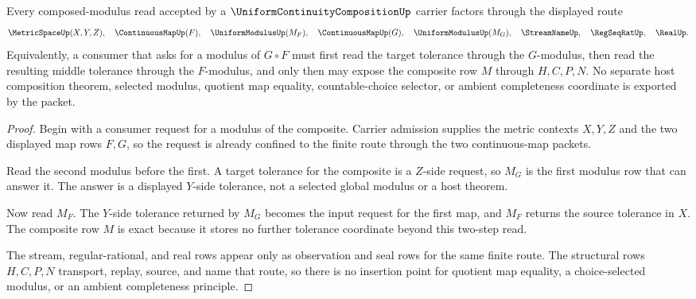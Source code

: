 \begin{theorem}
\label{thm:uniform-continuity-composition-modulus-factorization}
Every composed-modulus read accepted by a $\UniformContinuityCompositionUp$ carrier factors through the displayed route
$$
\MetricSpaceUp(X,Y,Z),\quad
\ContinuousMapUp(F),\quad
\UniformModulusUp(M_F),\quad
\ContinuousMapUp(G),\quad
\UniformModulusUp(M_G),\quad
\StreamNameUp,\quad
\RegSeqRatUp,\quad
\RealUp .
$$
Equivalently, a consumer that asks for a modulus of $G\circ F$ must first read the target tolerance through the $G$-modulus, then read the resulting middle tolerance through the $F$-modulus, and only then may expose the composite row $M$ through $H,C,P,N$. No separate host composition theorem, selected modulus, quotient map equality, countable-choice selector, or ambient completeness coordinate is exported by the packet.
\end{theorem}
\begin{proof}
Begin with a consumer request for a modulus of the composite. Carrier admission supplies the metric contexts $X,Y,Z$ and the two displayed map rows $F,G$, so the request is already confined to the finite route through the two continuous-map packets.

Read the second modulus before the first. A target tolerance for the composite is a $Z$-side request, so $M_G$ is the first modulus row that can answer it. The answer is a displayed $Y$-side tolerance, not a selected global modulus or a host theorem.

Now read $M_F$. The $Y$-side tolerance returned by $M_G$ becomes the input request for the first map, and $M_F$ returns the source tolerance in $X$. The composite row $M$ is exact because it stores no further tolerance coordinate beyond this two-step read.

The stream, regular-rational, and real rows appear only as observation and seal rows for the same finite route. The structural rows $H,C,P,N$ transport, replay, source, and name that route, so there is no insertion point for quotient map equality, a choice-selected modulus, or an ambient completeness principle.
\end{proof}

